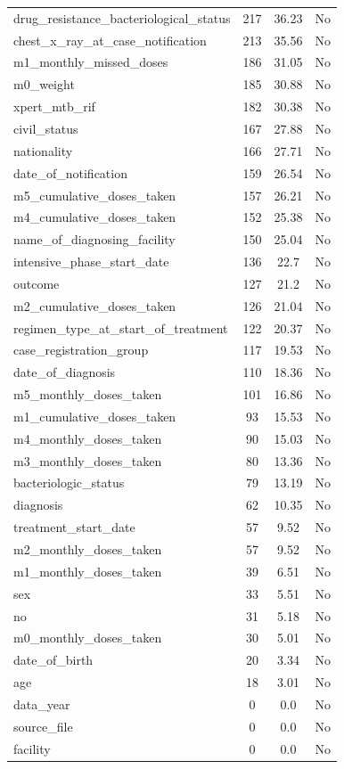 \begin{longtable}[l]{>{\raggedright\arraybackslash}p{}cc>{\centering\arraybackslash}p{}}
drug\_resistance\_bacteriological\_status & 217 & 36.23 & No \\
chest\_x\_ray\_at\_case\_notification & 213 & 35.56 & No \\
m1\_monthly\_missed\_doses & 186 & 31.05 & No \\
m0\_weight & 185 & 30.88 & No \\
xpert\_mtb\_rif & 182 & 30.38 & No \\
civil\_status & 167 & 27.88 & No \\
nationality & 166 & 27.71 & No \\
date\_of\_notification & 159 & 26.54 & No \\
m5\_cumulative\_doses\_taken & 157 & 26.21 & No \\
m4\_cumulative\_doses\_taken & 152 & 25.38 & No \\
name\_of\_diagnosing\_facility & 150 & 25.04 & No \\
intensive\_phase\_start\_date & 136 & 22.7 & No \\
outcome & 127 & 21.2 & No \\
m2\_cumulative\_doses\_taken & 126 & 21.04 & No \\
regimen\_type\_at\_start\_of\_treatment & 122 & 20.37 & No \\
case\_registration\_group & 117 & 19.53 & No \\
date\_of\_diagnosis & 110 & 18.36 & No \\
m5\_monthly\_doses\_taken & 101 & 16.86 & No \\
m1\_cumulative\_doses\_taken & 93 & 15.53 & No \\
m4\_monthly\_doses\_taken & 90 & 15.03 & No \\
m3\_monthly\_doses\_taken & 80 & 13.36 & No \\
bacteriologic\_status & 79 & 13.19 & No \\
diagnosis & 62 & 10.35 & No \\
treatment\_start\_date & 57 & 9.52 & No \\
m2\_monthly\_doses\_taken & 57 & 9.52 & No \\
m1\_monthly\_doses\_taken & 39 & 6.51 & No \\
sex & 33 & 5.51 & No \\
no & 31 & 5.18 & No \\
m0\_monthly\_doses\_taken & 30 & 5.01 & No \\
date\_of\_birth & 20 & 3.34 & No \\
age & 18 & 3.01 & No \\
data\_year & 0 & 0.0 & No \\
source\_file & 0 & 0.0 & No \\
facility & 0 & 0.0 & No \\
\end{longtable}
